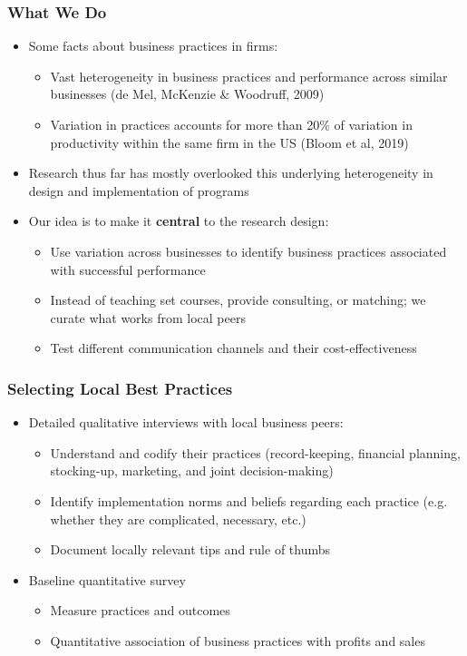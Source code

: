 \documentclass[10pt]{beamer}
\begin{document}
\begin{frame}
\frametitle{What We Do}
\begin{itemize}
\item Some facts about business practices in firms:
	\begin{itemize}	
	\item Vast heterogeneity in business practices and performance across similar businesses (de Mel, McKenzie \& Woodruff, 2009)
	\item Variation in practices accounts for more than 20\% of variation in productivity within the same firm in the US (Bloom et al, 2019)
	\end{itemize}
\vspace{0.2in}
\pause
\item Research thus far has mostly overlooked this underlying heterogeneity in design and implementation of programs
\vspace{0.2in}
\pause
\item Our idea is to make it \textbf{central} to the research design: 
	\begin{itemize}
	\item Use variation across businesses to identify business practices associated with successful performance
	\item Instead of teaching set courses, provide consulting, or matching; we curate what works from local peers
	\item Test different communication channels and their cost-effectiveness
\end{itemize}
\end{itemize}

\end{frame}

\begin{frame}
\frametitle{Selecting Local Best Practices}
\begin{itemize}
\item Detailed \textcolor[rgb]{0.00,0.07,1.00}{qualitative interviews} with local business peers:
    \begin{itemize}
    \item Understand and codify their practices (record-keeping, financial planning, stocking-up, marketing, and joint decision-making)
    \item Identify implementation norms and beliefs regarding each practice (e.g. whether they are complicated, necessary, etc.)
    \item Document locally relevant tips and rule of thumbs
    \end{itemize}
\vspace{0.2in}
\item Baseline \textcolor[rgb]{0.00,0.07,1.00}{quantitative survey}
    \begin{itemize}
    \item Measure practices and outcomes
    \item Quantitative association of business practices with profits and sales
    \end{itemize}
\end{itemize}
\end{frame}
\end{document}
